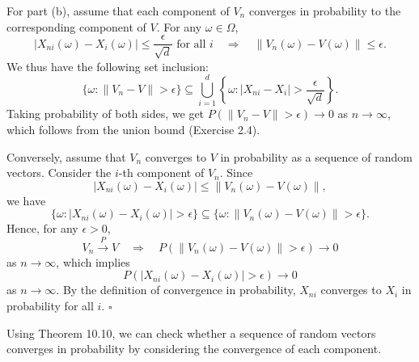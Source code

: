 For part (b), assume that each component of $V_n$ converges in probability to the corresponding component of $V$. For any $\omega\in\Omega$,
\[
\lvert X_{ni}(\omega)-X_i(\omega)\rvert\leq \frac{\epsilon}{\sqrt{d}}
\text{ for all } i
\quad\Longrightarrow\quad
\lVert V_n(\omega)-V(\omega)\rVert\leq \epsilon.
\]
We thus have the following set inclusion:
\[
\{\omega:\lVert V_n-V\rVert>\epsilon\}
\subseteq
\bigcup_{i=1}^{d}
\left\{\omega:\lvert X_{ni}-X_i\rvert>\frac{\epsilon}{\sqrt{d}}\right\}.
\]
Taking probability of both sides, we get $P(\lVert V_n-V\rVert>\epsilon)\to 0$ as $n\to\infty$, which follows from the union bound (Exercise 2.4).

Conversely, assume that $V_n$ converges to $V$ in probability as a sequence of random vectors. Consider the $i$-th component of $V_n$. Since
\[
\lvert X_{ni}(\omega)-X_i(\omega)\rvert
\leq
\lVert V_n(\omega)-V(\omega)\rVert,
\]
we have
\[
\{\omega:\lvert X_{ni}(\omega)-X_i(\omega)\rvert>\epsilon\}
\subseteq
\{\omega:\lVert V_n(\omega)-V(\omega)\rVert>\epsilon\}.
\]
Hence, for any $\epsilon>0$,
\[
V_n\xrightarrow{P}V
\quad\Longrightarrow\quad
P(\lVert V_n(\omega)-V(\omega)\rVert>\epsilon)\to 0
\]
as $n\to\infty$, which implies
\[
P(\lvert X_{ni}(\omega)-X_i(\omega)\rvert>\epsilon)\to 0
\]
as $n\to\infty$. By the definition of convergence in probability, $X_{ni}$ converges to $X_i$ in probability for all $i$.
\hfill $\square$

Using Theorem 10.10, we can check whether a sequence of random vectors converges in probability by considering the convergence of each component.
